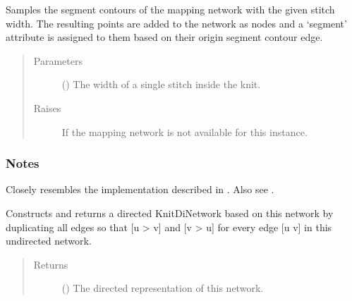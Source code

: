 \documentclass[letterpaper,10pt,english]{sphinxmanual}
\begin{document}
\begin{fulllineitems}
\begin{fulllineitems}
\label{\detokenize{cockatoo:cockatoo.KnitNetwork.sample_segment_contours}}
Samples the segment contours of the mapping network with the given
stitch width. The resulting points are added to the network as nodes
and a ‘segment’ attribute is assigned to them based on their origin
segment contour edge.
\begin{quote}\begin{description}
\item[{Parameters}] \leavevmode
{} () \textendash{} The width of a single stitch inside the knit.

\item[{Raises}] \leavevmode
{\hyperref[\detokenize{cockatoo:cockatoo.exception.MappingNetworkError}]{}} \textendash{} If the mapping network is not available for this instance.

\end{description}\end{quote}
\subsubsection*{Notes}

Closely resembles the implementation described in  \sphinxfootnotemark[1]. Also see
 \sphinxfootnotemark[2].

\end{fulllineitems}


\begin{fulllineitems}
\label{\detokenize{cockatoo:cockatoo.KnitNetwork.to_KnitDiNetwork}}
Constructs and returns a directed KnitDiNetwork based on this network
by duplicating all edges so that {[}u \sphinxhyphen{}\textgreater{} v{]} and {[}v \sphinxhyphen{}\textgreater{} u{]} for every
edge {[}u \sphinxhyphen{} v{]} in this undirected network.
\begin{quote}\begin{description}
\item[{Returns}] \leavevmode
{} ({\hyperref[\detokenize{cockatoo:cockatoo.KnitDiNetwork}]{}}) \textendash{} The directed representation of this network.


\end{description}
\end{quote}
\end{fulllineitems}
\end{fulllineitems}
\end{document}
